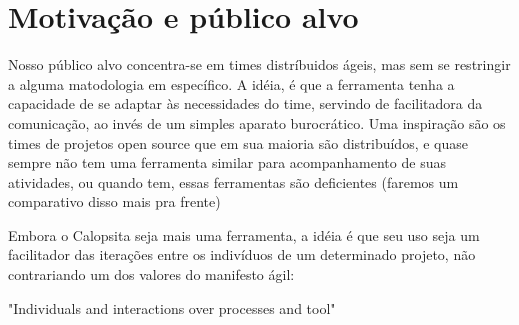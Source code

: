 \section{Motivação e público alvo}

Nosso público alvo concentra-se em times distríbuidos ágeis, mas sem se restringir a alguma matodologia em específico. A idéia, é que a ferramenta tenha a capacidade de se adaptar às necessidades do time, servindo de facilitadora da comunicação, ao invés de um simples aparato burocrático. Uma inspiração são os times de projetos open source que em sua maioria são distribuídos, e quase sempre não tem uma ferramenta similar para acompanhamento de suas atividades, ou quando tem, essas ferramentas são deficientes (faremos um comparativo disso mais pra frente)

Embora o Calopsita seja mais uma ferramenta, a idéia é que seu uso seja um facilitador das iterações entre os indivíduos de um determinado projeto, não contrariando um dos valores do manifesto ágil:

"Individuals and interactions over processes and tool"


